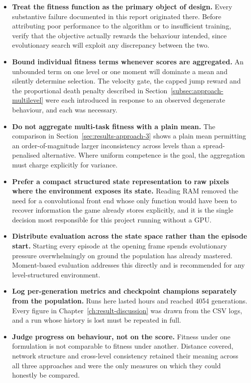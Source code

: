 \begin{itemize}
    \item \textbf{Treat the fitness function as the primary object of design.}
    Every substantive failure documented in this report originated there.
    Before attributing poor performance to the algorithm or to insufficient
    training, verify that the objective actually rewards the behaviour
    intended, since evolutionary search will exploit any discrepancy between
    the two.

    \item \textbf{Bound individual fitness terms whenever scores are
    aggregated.} An unbounded term on one level or one moment will dominate a
    mean and silently determine selection. The velocity gate, the capped jump
    reward and the proportional death penalty described in
    Section~\ref{subsec:approach-multilevel} were each introduced in response
    to an observed degenerate behaviour, and each was necessary.

    \item \textbf{Do not aggregate multi-task fitness with a plain mean.} The
    comparison in Section~\ref{sec:results-approach-3} shows a plain mean
    permitting an order-of-magnitude larger inconsistency across levels than a
    spread-penalised alternative. Where uniform competence is the goal, the
    aggregation must charge explicitly for variance.

    \item \textbf{Prefer a compact structured state representation to raw
    pixels where the environment exposes its state.} Reading RAM removed the
    need for a convolutional front end whose only function would have been to
    recover information the game already stores explicitly, and it is the
    single decision most responsible for this project running without a GPU.

    \item \textbf{Distribute evaluation across the state space rather than the
    episode start.} Starting every episode at the opening frame spends
    evolutionary pressure overwhelmingly on ground the population has already
    mastered. Moment-based evaluation addresses this directly and is
    recommended for any level-structured environment.

    \item \textbf{Log per-generation metrics and checkpoint champions
    separately from the population.} Runs here lasted hours and reached 4054
    generations. Every figure in Chapter~\ref{ch:result-discussion} was drawn
    from the CSV logs, and a run whose history is lost must be repeated in
    full.

    \item \textbf{Judge progress on behaviour, not on the score.} Fitness under
    one formulation is not comparable to fitness under another. Distance
    covered, network structure and cross-level consistency retained their
    meaning across all three approaches and were the only measures on which
    they could honestly be compared.
\end{itemize}

